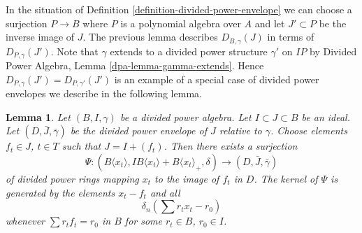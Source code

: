 \documentclass{stacks-project}
\theoremstyle{plain}
\newtheorem{lemma}[subsection]{Lemma}
\theoremstyle{definition}
\theoremstyle{remark}
\numberwithin{equation}{subsection}
\begin{document}
\noindent
In the situation of Definition \ref{definition-divided-power-envelope}
we can choose a surjection $P \to B$ where $P$ is a polynomial
algebra over $A$ and let $J' \subset P$ be the inverse image of $J$.
The previous lemma describes $D_{B, \gamma}(J)$ in terms of
$D_{P, \gamma}(J')$. Note that $\gamma$ extends to a divided power
structure $\gamma'$ on $IP$ by
Divided Power Algebra, Lemma \ref{dpa-lemma-gamma-extends}. Hence
$D_{P, \gamma}(J') = D_{P, \gamma'}(J')$ is an example of a special
case of divided power envelopes we describe in the following lemma.

\begin{lemma}
\label{lemma-describe-divided-power-envelope}
Let $(B, I, \gamma)$ be a divided power algebra. Let $I \subset J \subset B$
be an ideal. Let $(D, \bar J, \bar \gamma)$ be the divided power envelope
of $J$ relative to $\gamma$. Choose elements $f_t \in J$, $t \in T$ such
that $J = I + (f_t)$. Then there exists a surjection
$$
\Psi :
(B\langle x_t \rangle, IB\langle x_t \rangle + B\langle x_t \rangle_+, \delta)
\longrightarrow
(D, \bar J, \bar \gamma)
$$
of divided power rings mapping $x_t$ to the image of $f_t$ in $D$.
The kernel of $\Psi$ is generated by the elements $x_t - f_t$ and
all
$$
\delta_n\left(\sum r_t x_t - r_0\right)
$$
whenever $\sum r_t f_t = r_0$ in $B$ for some $r_t \in B$, $r_0 \in I$.
\end{lemma}
\end{document}
